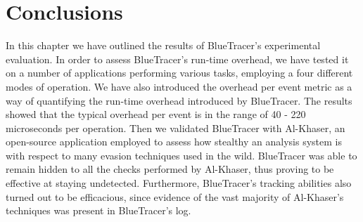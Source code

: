 \iffalse
\section{JoeBox}
\fi

\section{Conclusions}
In this chapter we have outlined the results of BlueTracer's experimental evaluation. In order to assess BlueTracer's run-time overhead, we have tested it on a number of applications performing various tasks, employing a four different modes of operation. We have also introduced the overhead per event metric as a way of quantifying the run-time overhead introduced by BlueTracer. The results showed that the typical overhead per event is in the range of 40 - 220 microseconds per operation.
Then we validated BlueTracer with Al-Khaser, an open-source application employed to assess how stealthy an analysis system is with respect to many evasion techniques used in the wild. BlueTracer was able to remain hidden to all the checks performed by Al-Khaser, thus proving to be effective at staying undetected. Furthermore, BlueTracer's tracking abilities also turned out to be efficacious, since evidence of the vast majority of Al-Khaser's techniques was present in BlueTracer's log.